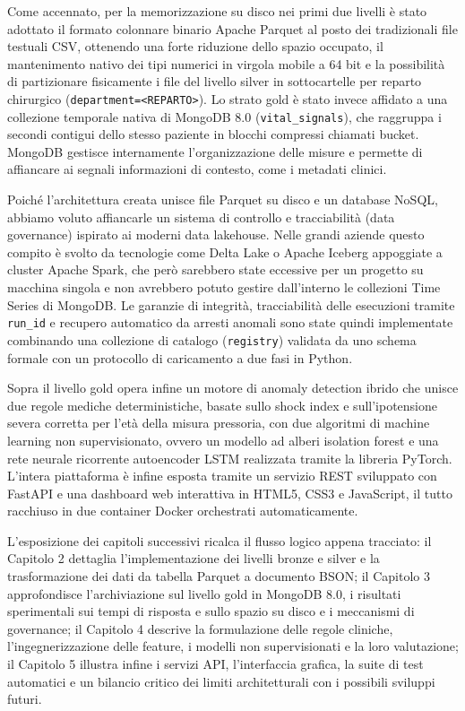 Come accennato, per la memorizzazione su disco nei primi due livelli \`e stato adottato il formato colonnare binario Apache Parquet al posto dei tradizionali file testuali CSV, ottenendo una forte riduzione dello spazio occupato, il mantenimento nativo dei tipi numerici in virgola mobile a 64 bit e la possibilit\`a di partizionare fisicamente i file del livello silver in sottocartelle per reparto chirurgico (\texttt{department=<REPARTO>}). Lo strato gold \`e stato invece affidato a una collezione temporale nativa di MongoDB 8.0 (\texttt{vital\_signals}), che raggruppa i secondi contigui dello stesso paziente in blocchi compressi chiamati bucket. MongoDB gestisce internamente l'organizzazione delle misure e permette di affiancare ai segnali informazioni di contesto, come i metadati clinici.

Poich\'e l'architettura creata unisce file Parquet su disco e un database NoSQL, abbiamo voluto affiancarle un sistema di controllo e tracciabilit\`a (data governance) ispirato ai moderni data lakehouse. Nelle grandi aziende questo compito \`e svolto da tecnologie come Delta Lake o Apache Iceberg appoggiate a cluster Apache Spark, che per\`o sarebbero state eccessive per un progetto su macchina singola e non avrebbero potuto gestire dall'interno le collezioni Time Series di MongoDB. Le garanzie di integrit\`a, tracciabilit\`a delle esecuzioni tramite \texttt{run\_id} e recupero automatico da arresti anomali sono state quindi implementate combinando una collezione di catalogo (\texttt{registry}) validata da uno schema formale con un protocollo di caricamento a due fasi in Python.

Sopra il livello gold opera infine un motore di anomaly detection ibrido che unisce due regole mediche deterministiche, basate sullo shock index e sull'ipotensione severa corretta per l'et\`a della misura pressoria, con due algoritmi di machine learning non supervisionato, ovvero un modello ad alberi isolation forest e una rete neurale ricorrente autoencoder LSTM realizzata tramite la libreria PyTorch. L'intera piattaforma \`e infine esposta tramite un servizio REST sviluppato con FastAPI e una dashboard web interattiva in HTML5, CSS3 e JavaScript, il tutto racchiuso in due container Docker orchestrati automaticamente.

L'esposizione dei capitoli successivi ricalca il flusso logico appena tracciato: il Capitolo 2 dettaglia l'implementazione dei livelli bronze e silver e la trasformazione dei dati da tabella Parquet a documento BSON; il Capitolo 3 approfondisce l'archiviazione sul livello gold in MongoDB 8.0, i risultati sperimentali sui tempi di risposta e sullo spazio su disco e i meccanismi di governance; il Capitolo 4 descrive la formulazione delle regole cliniche, l'ingegnerizzazione delle feature, i modelli non supervisionati e la loro valutazione; il Capitolo 5 illustra infine i servizi API, l'interfaccia grafica, la suite di test automatici e un bilancio critico dei limiti architetturali con i possibili sviluppi futuri.
